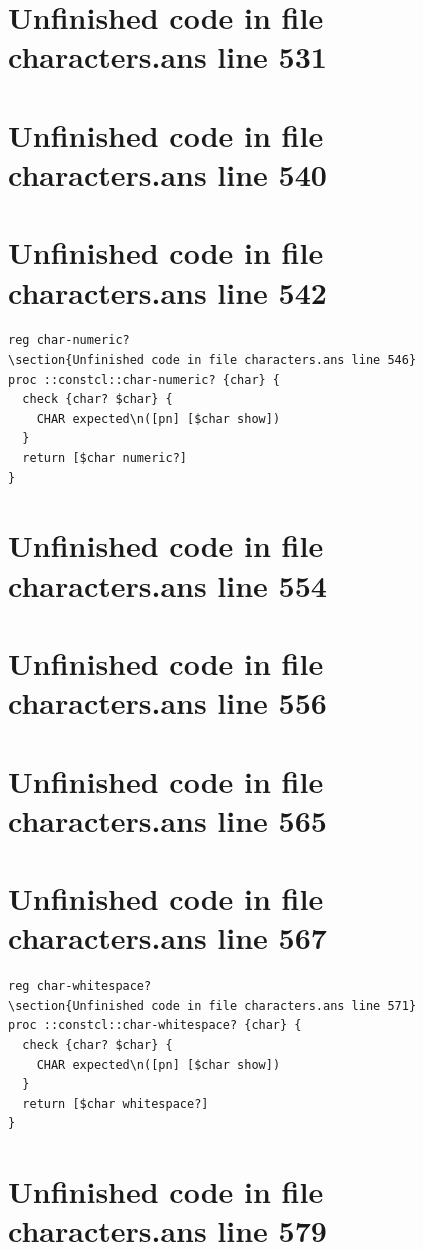 \documentclass[twoside,9pt]{report}
\begin{document}
\section{Unfinished code in file characters.ans line 531}
\section{Unfinished code in file characters.ans line 540}
\section{Unfinished code in file characters.ans line 542}
\begin{lstlisting}
reg char-numeric?
\section{Unfinished code in file characters.ans line 546}
proc ::constcl::char-numeric? {char} {
  check {char? $char} {
    CHAR expected\n([pn] [$char show])
  }
  return [$char numeric?]
}
\end{lstlisting}
\section{Unfinished code in file characters.ans line 554}
\section{Unfinished code in file characters.ans line 556}
\section{Unfinished code in file characters.ans line 565}
\section{Unfinished code in file characters.ans line 567}
\begin{lstlisting}
reg char-whitespace?
\section{Unfinished code in file characters.ans line 571}
proc ::constcl::char-whitespace? {char} {
  check {char? $char} {
    CHAR expected\n([pn] [$char show])
  }
  return [$char whitespace?]
}
\end{lstlisting}
\section{Unfinished code in file characters.ans line 579}
\end{document}
